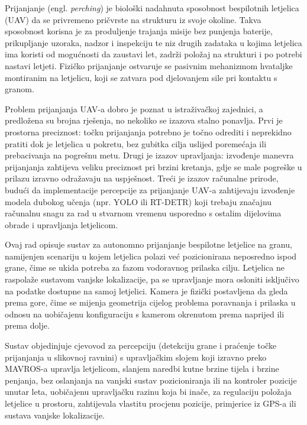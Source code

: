 Prijanjanje (engl. \emph{perching}) je biološki nadahnuta sposobnost bespilotnih letjelica (UAV) da se privremeno pričvrste na strukturu iz svoje okoline. Takva sposobnost korisna je za produljenje trajanja misije bez punjenja baterije, prikupljanje uzoraka, nadzor i inspekciju te niz drugih zadataka u kojima letjelica ima koristi od mogućnosti da zaustavi let, zadrži položaj na strukturi i po potrebi nastavi letjeti. Fizičko prijanjanje ostvaruje se pasivnim mehanizmom hvataljke montiranim na letjelicu, koji se zatvara pod djelovanjem sile pri kontaktu s granom.

Problem prijanjanja UAV-a dobro je poznat u istraživačkoj zajednici, a predložena su brojna rješenja, no nekoliko se izazova stalno ponavlja. Prvi je prostorna preciznost: točku prijanjanja potrebno je točno odrediti i neprekidno pratiti dok je letjelica u pokretu, bez gubitka cilja uslijed poremećaja ili prebacivanja na pogrešnu metu. Drugi je izazov upravljanja: izvođenje manevra prijanjanja zahtijeva veliku preciznost pri brzini kretanja, gdje se male pogreške u prilazu izravno odražavaju na uspješnost. Treći je izazov računalne prirode, budući da implementacije percepcije za prijanjanje UAV-a zahtijevaju izvođenje modela dubokog učenja (npr. YOLO ili RT-DETR) koji trebaju značajnu računalnu snagu za rad u stvarnom vremenu usporedno s ostalim dijelovima obrade i upravljanja letjelicom.

Ovaj rad opisuje sustav za autonomno prijanjanje bespilotne letjelice na granu, namijenjen scenariju u kojem letjelica polazi već pozicionirana neposredno ispod grane, čime se ukida potreba za fazom vodoravnog prilaska cilju. Letjelica ne raspolaže sustavom vanjske lokalizacije, pa se upravljanje mora osloniti isključivo na podatke dostupne na samoj letjelici. Kamera je fizički postavljena da gleda prema gore, čime se mijenja geometrija cijelog problema poravnanja i prilaska u odnosu na uobičajenu konfiguraciju s kamerom okrenutom prema naprijed ili prema dolje.

Sustav objedinjuje cjevovod za percepciju (detekciju grane i praćenje točke prijanjanja u slikovnoj ravnini) s upravljačkim slojem koji izravno preko MAVROS-a upravlja letjelicom, slanjem naredbi kutne brzine tijela i brzine penjanja, bez oslanjanja na vanjski sustav pozicioniranja ili na kontroler pozicije unutar leta, uobičajenu upravljačku razinu koja bi inače, za regulaciju položaja letjelice u prostoru, zahtijevala vlastitu procjenu pozicije, primjerice iz GPS-a ili sustava vanjske lokalizacije.

